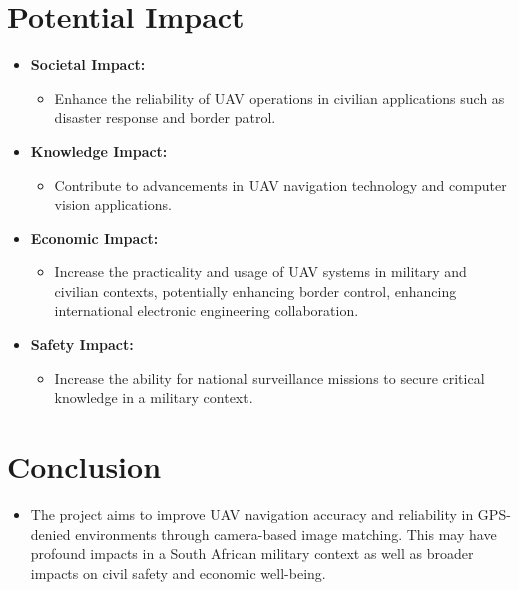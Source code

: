 \section{Potential Impact}
\begin{itemize}
    \item \textbf{Societal Impact:}
    \begin{itemize}
        \item Enhance the reliability of UAV operations in civilian applications such as disaster response and border patrol.
    \end{itemize}
    \item \textbf{Knowledge Impact:}
    \begin{itemize}
        \item Contribute to advancements in UAV navigation technology and computer vision applications.
    \end{itemize}
    \item \textbf{Economic Impact:}
    \begin{itemize}
        \item Increase the practicality and usage of UAV systems in military and civilian contexts, potentially enhancing border control, enhancing international electronic engineering collaboration.
    \end{itemize}
    \item \textbf{Safety Impact:}
    \begin{itemize}
        \item Increase the ability for national surveillance missions to secure critical knowledge in a military context.
    \end{itemize}
\end{itemize}

\section{Conclusion}
\begin{itemize}
    \item The project aims to improve UAV navigation accuracy and reliability in GPS-denied environments through camera-based image matching. This may have profound impacts in a South African military context as well as broader impacts on civil safety and economic well-being.
\end{itemize}

